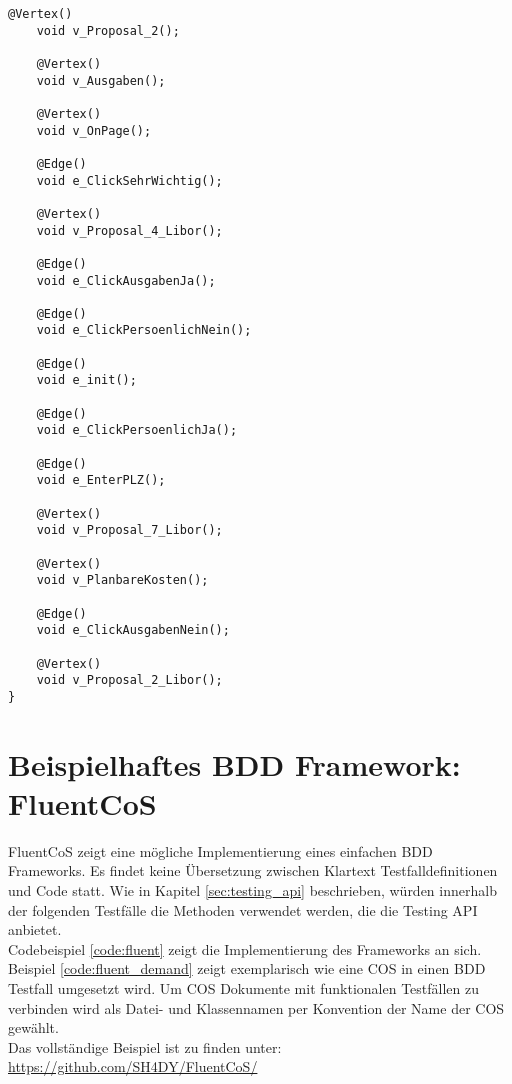 \begin{lstlisting}[caption=ModellLogisch.java, label=code:gw_generated]
    @Vertex()
    void v_Proposal_2();

    @Vertex()
    void v_Ausgaben();

    @Vertex()
    void v_OnPage();

    @Edge()
    void e_ClickSehrWichtig();

    @Vertex()
    void v_Proposal_4_Libor();

    @Edge()
    void e_ClickAusgabenJa();

    @Edge()
    void e_ClickPersoenlichNein();

    @Edge()
    void e_init();

    @Edge()
    void e_ClickPersoenlichJa();

    @Edge()
    void e_EnterPLZ();

    @Vertex()
    void v_Proposal_7_Libor();

    @Vertex()
    void v_PlanbareKosten();

    @Edge()
    void e_ClickAusgabenNein();

    @Vertex()
    void v_Proposal_2_Libor();
}
\end{lstlisting}

\section{Beispielhaftes BDD Framework: FluentCoS}
\label{app:fluent}
FluentCoS zeigt eine mögliche Implementierung eines einfachen BDD Frameworks. Es findet keine Übersetzung zwischen Klartext Testfalldefinitionen und Code statt. Wie in Kapitel \ref{sec:testing_api} beschrieben, würden innerhalb der folgenden Testfälle die Methoden verwendet werden, die die Testing API anbietet.\\

Codebeispiel \ref{code:fluent} zeigt die Implementierung des Frameworks an sich. Beispiel \ref{code:fluent_demand} zeigt exemplarisch wie eine \Gls{COS} in einen BDD Testfall umgesetzt wird. Um \Gls{COS} Dokumente mit funktionalen Testfällen zu verbinden wird als Datei- und Klassennamen per Konvention der Name der \Gls{COS} gewählt.\\

Das vollständige Beispiel ist zu finden unter: \url{https://github.com/SH4DY/FluentCoS/}

